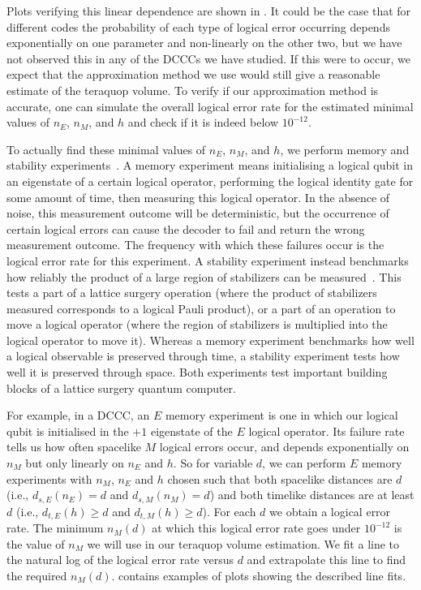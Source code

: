 Plots verifying this linear dependence are shown in .
It could be the case that for different codes the probability of each type of logical error occurring depends exponentially on one parameter and non-linearly on the other two, but we have not observed this in any of the DCCCs we have studied.
If this were to occur, we expect that the approximation method we use would still give a reasonable estimate of the teraquop volume.
To verify if our approximation method is accurate, one can simulate the overall logical error rate for the estimated minimal values of $n_E$, $n_M$, and $h$ and check if it is indeed below $10^{-12}$.

To actually find these minimal values of $n_E$, $n_M$, and $h$, we perform memory and stability experiments~\cite{gidney2022stability}.
A memory experiment means initialising a logical qubit in an eigenstate of a certain logical operator,
performing the logical identity gate for some amount of time,
then measuring this logical operator.
In the absence of noise, this measurement outcome will be deterministic, but the occurrence of certain logical errors can cause the decoder to fail and return the wrong measurement outcome.
The frequency with which these failures occur is the logical error rate for this experiment.
A stability experiment instead benchmarks how reliably the product of a large region of stabilizers can be measured~\cite{gidney2022stability}.
This tests a part of a lattice surgery operation (where the product of stabilizers measured corresponds to a logical Pauli product), or a part of an operation to move a logical operator (where the region of stabilizers is multiplied into the logical operator to move it).
Whereas a memory experiment benchmarks how well a logical observable is preserved through time, a stability experiment tests how well it is preserved through space.
Both experiments test important building blocks of a lattice surgery quantum computer.

For example, in a DCCC, an $E$ memory experiment is one in which our logical qubit is initialised in the $+1$ eigenstate of the $E$ logical operator.
Its failure rate tells us how often spacelike $M$ logical errors occur,
and depends exponentially on $n_M$ but only linearly on $n_E$ and $h$.
So for variable $d$, we can perform $E$ memory experiments with $n_M$, $n_E$ and $h$ chosen such that both spacelike distances are $d$ (i.e., $d_{s,E}(n_E) = d$ and $d_{s,M}(n_M) = d$) and both timelike distances are at least $d$ (i.e., $d_{t,E}(h) \geq d$ and $d_{t,M}(h) \geq d$).
For each $d$ we obtain a logical error rate.
The minimum $n_M(d)$ at which this logical error rate goes under $10^{-12}$ is the value of $n_M$ we will use in our teraquop volume estimation.
We fit a line to the natural log of the logical error rate versus $d$ and extrapolate this line to find the required $n_M(d)$. 
 contains examples of plots showing the described line fits.

